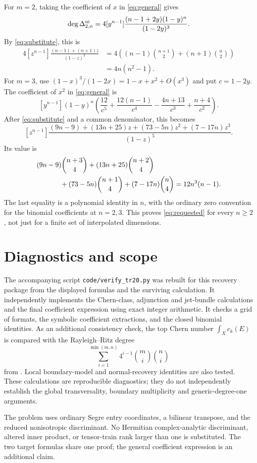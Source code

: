 \documentclass[11pt]{article}
\begin{document}
For $m=2$, taking the coefficient of $x$ in \eqref{eq:general} gives
\[
 \deg\Delta^{\rm ni}_{2,n}
 =4[y^{n-1}]\frac{(n-1+2y)(1-y)^n}{(1-2y)^3}.
\]
By \eqref{eq:substitute}, this is
\begin{align*}
 4[z^{n-1}]\frac{(n-1)+(n+1)z}{(1-z)^3}
 &=4\left((n-1)\binom{n+1}{2}+(n+1)\binom n2\right)\\
 &=4n(n^2-1).
\end{align*}
For $m=3$, use
$(1-x)^3/(1-2x)=1-x+x^2+O(x^3)$ and put $c=1-2y$.
The coefficient of $x^2$ in \eqref{eq:general} is
\[
 [y^{n-1}](1-y)^n\left(
 \frac{12}{c^5}+\frac{12(n-1)}{c^4}
 -\frac{4n+13}{c^3}+\frac{n+4}{c^2}\right).
\]
After \eqref{eq:substitute} and a common denominator, this becomes
\[
 [z^{n-1}]
 \frac{(9n-9)+(13n+25)z+(73-5n)z^2+(7-17n)z^3}{(1-z)^5}.
\]
Its value is
\begin{align*}
 &(9n-9)\binom{n+3}{4}+(13n+25)\binom{n+2}{4}\\
 &\hspace{12mm}+(73-5n)\binom{n+1}{4}+(7-17n)\binom n4
 =12n^3(n-1).
\end{align*}
The last equality is a polynomial identity in $n$, with the ordinary
zero convention for the binomial coefficients at $n=2,3$.
This proves \eqref{eq:requested} for every $n\ge2$, not just for a
finite set of interpolated dimensions.

\section{Diagnostics and scope}
The accompanying script \texttt{code/verify\_tr20.py} was rebuilt for
this recovery package from the displayed formulas and the surviving
calculation. It independently implements the Chern-class, adjunction and jet-bundle
calculations and the final coefficient expression using exact integer
arithmetic. It checks a grid of formats, the symbolic coefficient
extractions, and the closed binomial identities. As an additional
consistency check, the top Chern number $\int_X c_k(E)$ is compared with
the Rayleigh--Ritz degree
\[
 \sum_{i=1}^{\min(m,n)}4^{i-1}\binom mi\binom ni
\]
from \cite[Corollary 5.3]{SSW}. Local boundary-model and normal-recovery
identities are also tested. These calculations are reproducible
diagnostics; they do not independently establish the global
transversality, boundary multiplicity and generic-degree-one arguments.

The problem uses ordinary Segre entry coordinates, a bilinear
transpose, and the reduced nonisotropic discriminant. No Hermitian
complex-analytic discriminant, altered inner product, or tensor-train
rank larger than one is substituted. The two target formulas share
one proof; the general coefficient expression is an additional claim.
\end{document}
